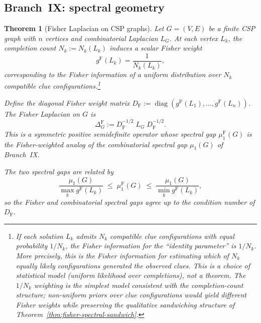 \documentclass[11pt]{article}
\DeclareMathOperator{\diag}{diag}
\newcommand{\gF}{g^{\mathrm{F}}}
\newtheorem{theorem}{Theorem}
\theoremstyle{remark}
\begin{document}
\subsection{Branch~IX: spectral geometry}

\begin{theorem}[Fisher Laplacian on CSP graphs]
\label{thm:fisher-csp}
Let $G = (V, E)$ be a finite CSP graph with $n$ vertices and combinatorial
Laplacian $L_G$.  At each vertex $L_k$, the completion count $N_k := N_k(L_k)$
induces a scalar Fisher weight
\begin{equation}\label{eq:fisher-csp-weight}
\gF(L_k) = \frac{1}{N_k(L_k)},
\end{equation}
corresponding to the Fisher information of a uniform distribution over
$N_k$ compatible clue configurations.\footnote{If each solution $L_k$ admits
$N_k$ compatible clue configurations with equal probability $1/N_k$, the
Fisher information for the ``identity parameter'' is $1/N_k$.  More precisely,
this is the Fisher information for estimating which of $N_k$ equally likely
configurations generated the observed clues.
\emph{This is a choice of statistical model} (uniform likelihood over
completions), not a theorem.  The $1/N_k$ weighting is the simplest model
consistent with the completion-count structure; non-uniform priors over
clue configurations would yield different Fisher weights while preserving
the qualitative sandwiching structure of Theorem~\ref{thm:fisher-spectral-sandwich}.}

Define the diagonal Fisher weight matrix
$D_{\mathrm{F}} := \diag(\gF(L_1), \dots, \gF(L_n))$.  The
\emph{Fisher Laplacian on $G$} is
\begin{equation}\label{eq:fisher-laplacian-csp}
\Delta^{\mathrm{F}}_G
:= D_{\mathrm{F}}^{-1/2}\; L_G\; D_{\mathrm{F}}^{-1/2}.
\end{equation}
This is a symmetric positive semidefinite operator whose spectral gap
$\mu_1^{\mathrm{F}}(G)$ is the Fisher-weighted analog of the combinatorial
spectral gap $\mu_1(G)$ of Branch~IX.

The two spectral gaps are related by
\begin{equation}\label{eq:gap-relation}
\frac{\mu_1(G)}{\max_k \gF(L_k)}
\;\le\;
\mu_1^{\mathrm{F}}(G)
\;\le\;
\frac{\mu_1(G)}{\min_k \gF(L_k)},
\end{equation}
so the Fisher and combinatorial spectral gaps agree up to the condition number
of $D_{\mathrm{F}}$.
\end{theorem}
\end{document}
